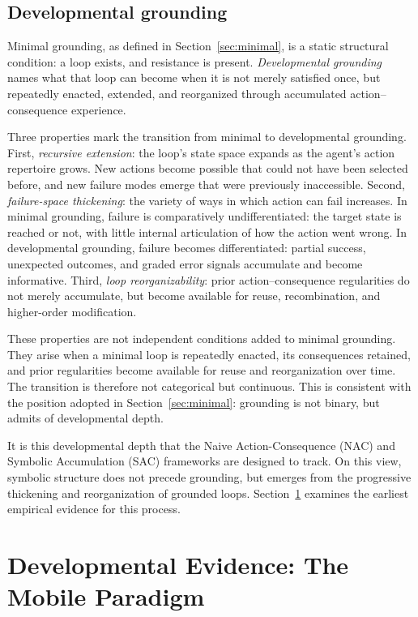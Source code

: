 \documentclass[11pt]{article}
\begin{document}
\subsection{Developmental grounding}
\label{sec:developmental-grounding}

Minimal grounding, as defined in Section~\ref{sec:minimal}, is a
static structural condition: a loop exists, and resistance is present.
\emph{Developmental grounding} names what that loop can become when it
is not merely satisfied once, but repeatedly enacted, extended, and
reorganized through accumulated action--consequence experience.

Three properties mark the transition from minimal to developmental
grounding. First, \emph{recursive extension}: the loop's state space
expands as the agent's action repertoire grows. New actions become
possible that could not have been selected before, and new failure
modes emerge that were previously inaccessible. Second,
\emph{failure-space thickening}: the variety of ways in which action
can fail increases. In minimal grounding, failure is comparatively
undifferentiated: the target state is reached or not, with little
internal articulation of how the action went wrong. In developmental
grounding, failure becomes differentiated: partial success, unexpected
outcomes, and graded error signals accumulate and become informative.
Third, \emph{loop reorganizability}: prior action--consequence
regularities do not merely accumulate, but become available for
reuse, recombination, and higher-order modification.

These properties are not independent conditions added to minimal
grounding. They arise when a minimal loop is repeatedly enacted, its
consequences retained, and prior regularities become available for
reuse and reorganization over time. The transition is therefore not
categorical but continuous. This is consistent with the position
adopted in Section~\ref{sec:minimal}: grounding is not binary, but
admits of developmental depth.

It is this developmental depth that the Naive Action-Consequence (NAC)
and Symbolic Accumulation (SAC) frameworks are designed to track. On
this view, symbolic structure does not precede grounding, but emerges
from the progressive thickening and reorganization of grounded loops.
Section~\ref{sec:dev} examines the earliest empirical evidence for
this process.

\section{Developmental Evidence: The Mobile Paradigm}
\label{sec:dev}
\end{document}
